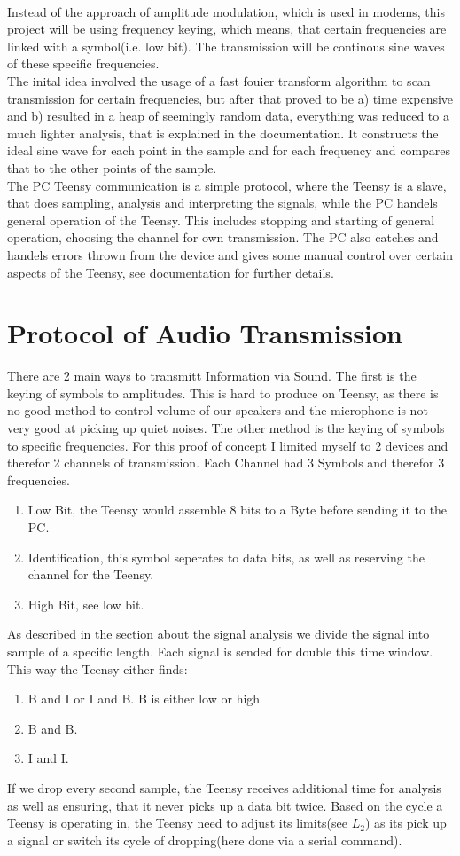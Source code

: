 \documentclass{book}
\begin{document}
\\Instead of the approach of amplitude modulation, which is used in modems, this project will be using frequency keying, which means, that certain frequencies are linked with a symbol(i.e. low bit). The transmission will be continous sine waves of these specific frequencies.
\\The inital idea involved the usage of a fast fouier transform algorithm to scan transmission for certain frequencies, but after that proved to be a) time expensive and b) resulted in a heap of seemingly random data, everything was reduced to a much lighter analysis, that is explained in the documentation. It constructs the ideal sine wave for each point in the sample and for each frequency and compares that to the other points of the sample. 
\\The PC Teensy communication is a simple protocol, where the Teensy is a slave, that does sampling, analysis and interpreting the signals, while the PC handels general operation of the Teensy. This includes stopping and starting of general operation, choosing the channel for own transmission. The PC also catches and handels errors thrown from the device and gives some manual control over certain aspects of the Teensy, see documentation for further details. 

\chapter{Protocol of Audio Transmission}
There are 2 main ways to transmitt Information via Sound. The first is the keying of symbols to amplitudes. This is hard to produce on Teensy, as there is no good method to control volume of our speakers and the microphone is not very good at picking up quiet noises. The other method is the keying of symbols to specific frequencies. For this proof of concept I limited myself to 2 devices and therefor 2 channels of transmission. Each Channel had 3 Symbols and therefor 3 frequencies. 
\begin{enumerate}
\item Low Bit, the Teensy would assemble 8 bits to a Byte before sending it to the PC.
\item Identification, this symbol seperates to data bits, as well as reserving the channel for the Teensy.
\item High Bit, see low bit.
\end{enumerate}
As described in the section about the signal analysis we divide the signal into sample of a specific length. Each signal is sended for double this time window. This way the Teensy either finds:
\begin{enumerate}
\item B and I or I and B. B is either low or high
\item B and B.
\item I and I.
\end{enumerate}
If we drop every second sample, the Teensy receives additional time for analysis as well as ensuring, that it never picks up a data bit twice. Based on the cycle a Teensy is operating in, the Teensy need to adjust its limits(see $L_2$) as its pick up a signal or switch its cycle of dropping(here done via a serial command).
\end{document}
